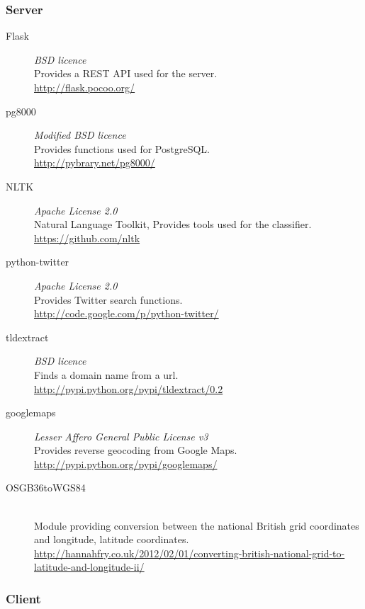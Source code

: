 \subsubsection{Server}

\begin{description}
    \item[Flask] \emph{BSD licence} \hfill \\
        Provides a REST API used for the server.\\
        \url{http://flask.pocoo.org/}
    \item[pg8000] \emph{Modified BSD licence} \hfill \\
        Provides functions used for PostgreSQL.\\
        \url{http://pybrary.net/pg8000/}
    \item[NLTK] \emph{Apache License 2.0} \hfill \\
        Natural Language Toolkit, Provides tools used for the classifier.\\
        \url{https://github.com/nltk}
    \item[python-twitter] \emph{Apache License 2.0} \hfill \\
        Provides Twitter search functions.\\
        \url{http://code.google.com/p/python-twitter/}
    \item[tldextract] \emph{BSD licence} \hfill \\
        Finds a domain name from a url.\\
        \url{http://pypi.python.org/pypi/tldextract/0.2}
    \item[googlemaps] \emph{Lesser Affero General Public License v3}\hfill \\
        Provides reverse geocoding from Google Maps.\\
        \url{http://pypi.python.org/pypi/googlemaps/}
    \item[OSGB36toWGS84] \hfill \\
        Module providing conversion between the national British grid coordinates and longitude, latitude coordinates.\\
        \url{http://hannahfry.co.uk/2012/02/01/converting-british-national-grid-to-latitude-and-longitude-ii/}
\end{description}

\subsubsection{Client}

